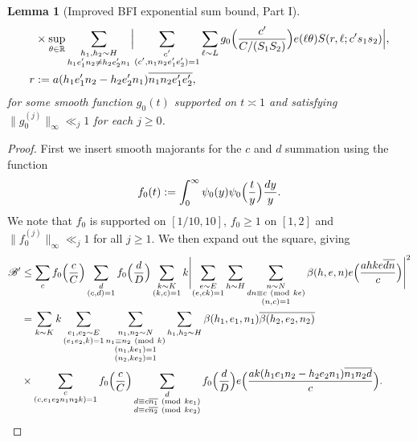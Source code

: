 \documentclass[10pt]{amsart}
\theoremstyle{plain}
\newtheorem{lmm}[thrm]{Lemma}
\numberwithin{equation}{section}
\newcommand{\Mod}[1]{\ (\mathrm{mod}\ #1)}
\begin{document}
\begin{lmm}[Improved BFI exponential sum bound, Part I]
\begin{align*}
&\times\sup_{\theta\in\mathbb{R}}\sum_{\substack{h_1,h_2\sim H\\ h_1e_1'n_2\ne h_2e_2'n_1}}\Bigl|\sum_{\substack{c'\\ (c',n_1n_2e_1'e_2')=1}}\sum_{\ell\sim L}g_{0}\Bigl(\frac{c'}{C/(S_1S_2)}\Bigr)e(\ell \theta)S(r,\ell;c' s_1 s_2)\Bigr|,\\
r&:=a (h_1e_1'n_2-h_2e_2'n_1)\overline{n_1n_2e_1'e_2'},
\end{align*}
for some smooth function $g_0(t)$ supported on $t\asymp 1$ and satisfying $\|g_0^{(j)}\|_\infty\ll_j 1$ for each $j\ge 0$.
\end{lmm}
%
%
%
%
\begin{proof}
First we insert smooth majorants for the $c$ and $d$ summation using the function
\begin{equation}
f_0(t):=\int_0^\infty \psi_0(y)\psi_0\Bigl(\frac{t}{y}\Bigr)\frac{dy}{y}.
\label{eq:F0Def}
\end{equation}
We note that $f_0$ is supported on $[1/10,10]$, $f_0\ge 1$ on $[1,2]$ and $\|f_0^{(j)}\|_\infty\ll_j 1$ for all $j\ge 1$. We then expand out the square, giving
\begin{align*}
\mathscr{B}'&\le \sum_{c}f_0\Bigl(\frac{c}{C}\Bigr)\sum_{\substack{d\\ (c,d)=1}}f_0\Bigl(\frac{d}{D}\Bigr)\sum_{\substack{k\sim K \\ (k,c)=1}}k\Biggl|\sum_{\substack{e\sim E\\ (e,ck)=1}}\sum_{ h\sim H}\sum_{\substack{ n\sim N\\ d n\equiv c\Mod{k e}\\ (n,c)=1}}\beta(h,e,n)e\Bigl(\frac{a h k e \overline{d n}}{c}\Bigr)\Biggr|^2\\
&=\sum_{k\sim K}k\sum_{\substack{e_1,e_2\sim E\\ (e_1e_2,k)=1}}\sum_{\substack{n_1,n_2\sim N\\ n_1\equiv n_2\Mod{k}\\ (n_1,ke_1)=1\\ (n_2,ke_2)=1}}\sum_{h_1,h_2\sim H}\beta(h_1,e_1,n_1)\overline{\beta(h_2,e_2,n_2)}\\
& \times \sum_{\substack{c\\ (c,e_1e_2n_1n_2k)=1}}f_0\Bigl(\frac{c}{C}\Bigr)\sum_{\substack{d\\ d\equiv c\overline{n_1}\Mod{ke_1}\\ d\equiv c\overline{n_2} \Mod{ke_2}}}f_0\Bigl(\frac{d}{D}\Bigr)e\Bigl(\frac{ak(h_1e_1n_2-h_2e_2n_1)\overline{n_1n_2d}}{c}\Bigr).
\end{align*}	

\end{proof}
\end{document}
